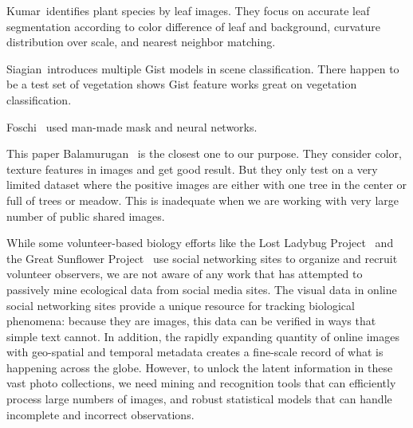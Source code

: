 Kumar\etal~\cite{kumar2012leafsnap}identifies plant species by leaf images. They focus on accurate leaf segmentation according to color difference of leaf and background, curvature distribution over scale, and nearest neighbor matching.


Siagian\etal~\cite{siagian2008comparison}introduces multiple Gist models in scene classification. There happen to be a test set of vegetation shows Gist feature works great on vegetation classification.


Foschi\etal~\cite{foschi1997detecting} used man-made mask and neural networks.


This paper Balamurugan\etal~\cite{balamurugan2007greenery}
is the closest one to our purpose.
They consider color, texture features in images and get good result. But they only test on a very limited dataset where the positive images are either with one tree in the center or full of trees or meadow. This is inadequate when we are working with   very large number of public shared images.


While some volunteer-based biology efforts like the Lost Ladybug
Project~\cite{lostladybug} and the Great Sunflower
Project~\cite{greatsunflower} use social networking sites to
organize and recruit volunteer observers, we are not aware of any
work that has attempted to passively mine ecological data from social media
sites. The visual data in online social networking sites provide a
unique resource for tracking biological phenomena:  because they are
images, this data can be verified in ways that simple text 
cannot.  In addition, the rapidly expanding quantity
of online images with geo-spatial and temporal metadata creates a
fine-scale record of what is happening across the globe.  However, to
unlock the latent information in these vast photo collections, we need
mining and recognition tools that can efficiently
process large numbers of images, and robust statistical models that
can handle incomplete and incorrect observations.